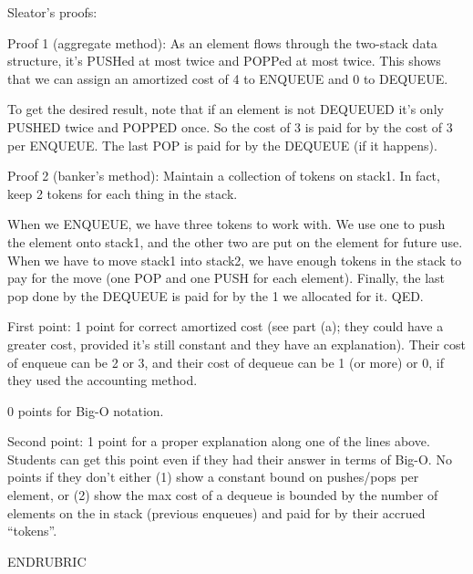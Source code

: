 \begin{parts}
Sleator's proofs:

Proof 1 (aggregate method): As an element flows through the
two-stack data structure, it's PUSHed at most twice and
POPPed at most twice.  This shows that we can assign an
amortized cost of 4 to ENQUEUE and 0 to DEQUEUE.

To get the desired result, note that if an element is not
DEQUEUED it's only PUSHED twice and POPPED once.  So the
cost of 3 is paid for by the cost of 3 per ENQUEUE.  The
last POP is paid for by the DEQUEUE (if it happens).

Proof 2 (banker's method): Maintain a collection of tokens
on stack1.  In fact, keep 2 tokens for each thing in the
stack.

When we ENQUEUE, we have three tokens to work with.  We use
one to push the element onto stack1, and the other two are
put on the element for future use.  When we have to move
stack1 into stack2, we have enough tokens in the stack to
pay for the move (one POP and one PUSH for each element).
Finally, the last pop done by the DEQUEUE is paid for by the
1 we allocated for it. QED.

First point:
1 point for correct amortized cost (see part (a); they could have a
greater cost, provided it's still constant and they have an
explanation). Their cost of enqueue can be 2 or 3, and their cost of
dequeue can be 1 (or more) or 0, if they used the accounting method.

0 points for Big-O notation.

Second point:
1 point for a proper explanation along one of the lines
above. Students can get this point even if they had their answer in
terms of Big-O. No points if they don't either (1) show a constant
bound on pushes/pops per element, or (2) show the max cost of a
dequeue is bounded by the number of elements on the in stack (previous
enqueues) and paid for by their accrued ``tokens''.

ENDRUBRIC

\end{parts}